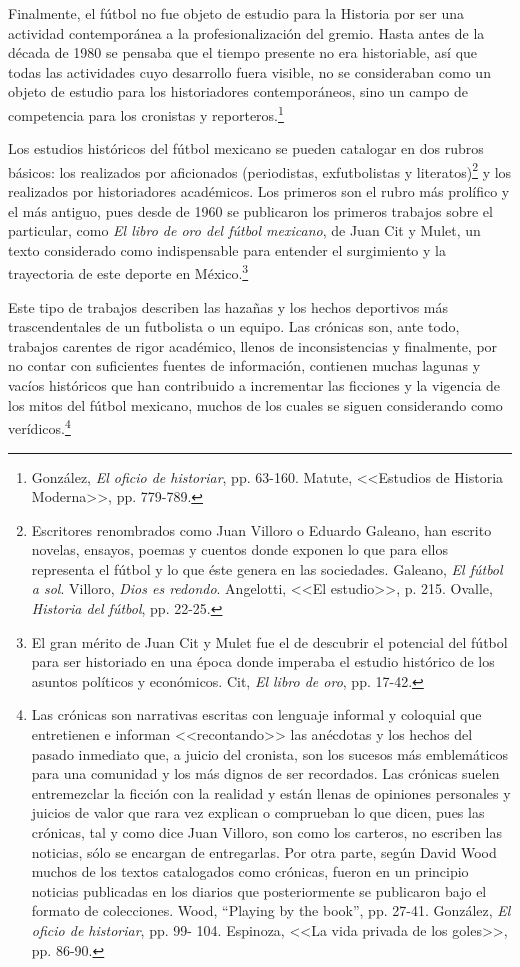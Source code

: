 \documentclass[11pt,a5paper,twoside]{book} %
\begin{document}
Finalmente, el fútbol no fue objeto de estudio para la Historia por ser una actividad contemporánea a la profesionalización del gremio. Hasta antes de la década de 1980 se pensaba que el tiempo presente no era historiable, así que todas las actividades cuyo desarrollo fuera visible, no se consideraban como un objeto de estudio para los historiadores contemporáneos, sino un campo de competencia para los cronistas y reporteros.\footnote{González, \emph{El oficio de historiar}, pp. 63-160. Matute, <<Estudios de Historia Moderna>>, pp. 779-789.}

Los estudios históricos del fútbol mexicano se pueden catalogar en dos rubros
básicos: los realizados por aficionados (periodistas, exfutbolistas y literatos)\footnote{Escritores renombrados como Juan Villoro o Eduardo Galeano, han escrito novelas, ensayos, poemas y cuentos donde exponen lo que para ellos representa el fútbol y lo que éste genera en las sociedades. Galeano, \emph{El fútbol a sol}. Villoro, \emph{Dios es redondo}. Angelotti, <<El estudio>>, p. 215. Ovalle, \emph{Historia del fútbol}, pp. 22-25.} y los
realizados por historiadores académicos. Los primeros son el rubro más prolífico y el más
antiguo, pues desde de 1960 se publicaron los primeros trabajos sobre el particular, como \emph{El
libro de oro del fútbol mexicano}, de Juan Cit y Mulet, un texto considerado como
indispensable para entender el surgimiento y la trayectoria de este deporte en México.\footnote{El gran mérito de Juan Cit y Mulet fue el de descubrir el potencial del fútbol para ser historiado en una época donde imperaba el estudio histórico de los asuntos políticos y económicos. Cit, \emph{El libro de oro}, pp. 17-42.}

Este tipo de trabajos describen las hazañas y los hechos deportivos más
trascendentales de un futbolista o un equipo. Las crónicas son, ante todo, trabajos carentes
de rigor académico, llenos de inconsistencias y finalmente, por no contar con suficientes
fuentes de información, contienen muchas lagunas y vacíos históricos que han contribuido a
incrementar las ficciones y la vigencia de los mitos del fútbol mexicano, muchos de los cuales
se siguen considerando como verídicos.\footnote{Las crónicas son narrativas escritas con lenguaje informal y coloquial que entretienen e informan <<recontando>> las anécdotas y los hechos del pasado inmediato que, a juicio del cronista, son los sucesos más emblemáticos para una comunidad y los más dignos de ser recordados. Las crónicas suelen entremezclar la ficción con la realidad y están llenas de opiniones personales y juicios de valor que rara vez explican o comprueban lo que dicen, pues las crónicas, tal y como dice Juan Villoro, son como los carteros, no escriben las noticias, sólo se encargan de entregarlas. Por otra parte, según David Wood muchos de los textos catalogados como crónicas, fueron en un principio noticias publicadas en los diarios que posteriormente se publicaron bajo
el formato de colecciones. Wood, ``Playing by the book'', pp. 27-41. González, \emph{El oficio de historiar}, pp. 99-
104. Espinoza, <<La vida privada de los goles>>, pp. 86-90.}
\end{document}
